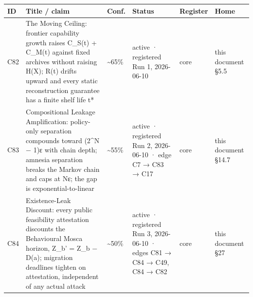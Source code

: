 \documentclass[
  11pt,
]{article}
\newcounter{none} %
\begin{document}
{\def\LTcaptype{none} %
\begin{longtable}[]{@{}
  >{\raggedright\arraybackslash}p{}
  >{\raggedright\arraybackslash}p{}
  >{\raggedright\arraybackslash}p{}
  >{\raggedright\arraybackslash}p{}
  >{\raggedright\arraybackslash}p{}
  >{\raggedright\arraybackslash}p{}@{}}
\toprule\noalign{}
\begin{minipage}[b]{\linewidth}\raggedright
ID
\end{minipage} & \begin{minipage}[b]{\linewidth}\raggedright
Title / claim
\end{minipage} & \begin{minipage}[b]{\linewidth}\raggedright
Conf.
\end{minipage} & \begin{minipage}[b]{\linewidth}\raggedright
Status
\end{minipage} & \begin{minipage}[b]{\linewidth}\raggedright
Register
\end{minipage} & \begin{minipage}[b]{\linewidth}\raggedright
Home
\end{minipage} \\
\midrule\noalign{}
\endhead
\bottomrule\noalign{}
\endlastfoot
C82 & The Moving Ceiling: frontier capability growth raises C\_S(t) +
C\_M(t) against fixed archives without raising H(X); R(t) drifts upward
and every static reconstruction guarantee has a finite shelf life t* &
\textasciitilde65\% & active · registered Run 1, 2026-06-10 & core &
this document §5.5 \\
C83 & Compositional Leakage Amplification: policy-only separation
compounds toward (2\^{}N − 1)ε with chain depth; amnesia separation
breaks the Markov chain and caps at Nε; the gap is exponential-to-linear
& \textasciitilde55\% & active · registered Run 2, 2026-06-10 · edge C7
→ C83 → C17 & core & this document §14.7 \\
C84 & Existence-Leak Discount: every public feasibility attestation
discounts the Behavioural Mosca horizon, Z\_b' = Z\_b − D(a); migration
deadlines tighten on attestation, independent of any actual attack &
\textasciitilde50\% & active · registered Run 3, 2026-06-10 · edges C81
→ C84 → C49, C84 → C82 & core & this document §27 \\

\end{longtable}}
\end{document}
